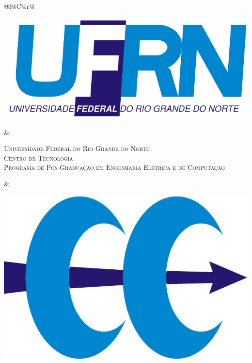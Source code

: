 %
%

\begin{titlepage}

\begin{center}

\small

\begin{tabularx}{\linewidth}{@{}l@{}C@{}r@{}}
\parbox[c]{3cm}{\includegraphics[width=\linewidth]{./figuras/UFRN}} &
\begin{center}
\textsf{\textsc{Universidade Federal do Rio Grande do Norte\\
Centro de Tecnologia\\
Programa de Pós-Graduação em Engenharia Elétrica e de Computação}}
\end{center} &
\parbox[c]{2cm}{\includegraphics[width=\linewidth]{./figuras/PPgEE}}
\end{tabularx}


\end{center}
\end{titlepage}
